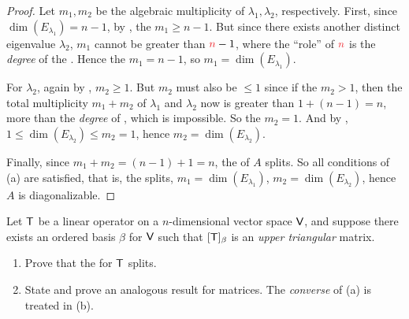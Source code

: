 \begin{proof}
Let \(m_1, m_2\) be the algebraic multiplicity of \(\lambda_1, \lambda_2\), respectively.
First, since \(\dim(E_{\lambda_1}) = n - 1\), by , the \(m_1 \ge n - 1\).
But since there exists another distinct eigenvalue \(\lambda_2\), \(m_1\) cannot be greater than \(\RED{n} - 1\), where the ``role'' of \(\RED{n}\) is the \emph{degree} of the \CPOLY{}.
Hence the \(m_1 = n - 1\), so \(m_1 = \dim(E_{\lambda_1})\).

For \(\lambda_2\), again by , \(m_2 \ge 1\).
But \(m_2\) must also be \(\le 1\) since if the \(m_2 > 1\), then the total multiplicity \(m_1 + m_2\) of \(\lambda_1\) and \(\lambda_2\) now is greater than \(1 + (n - 1) = n\), more than the \emph{degree} of \CPOLY{}, which is impossible.
So the \(m_2 = 1\).
And by , \(1 \le \dim(E_{\lambda_2}) \le m_2 = 1\), hence  \(m_2 = \dim(E_{\lambda_2})\).

Finally, since \(m_1 + m_2 = (n - 1) + 1 = n\), the \CPOLY{} of \(A\) splits.
So all conditions of (a) are satisfied, that is, the \CPOLY{} splits, \(m_1 = \dim(E_{\lambda_1})\), \(m_2 = \dim(E_{\lambda_2})\), hence \(A\) is diagonalizable.
\end{proof}

\begin{exercise} \label{exercise 5.2.9}
Let \(\textsf{T}\) be a linear operator on a \(n\)-dimensional vector space \(\textsf{V}\), and suppose there exists an ordered basis \(\beta\) for \(\textsf{V}\) such that \([\textsf{T}]_{\beta}\) is an \emph{upper triangular} matrix.
\begin{enumerate}
\item Prove that the \CPOLY{} for \(\textsf{T}\) splits.
\item State and prove an analogous result for matrices.
The \emph{converse} of (a) is treated in (b).
\end{enumerate}
\end{exercise}

